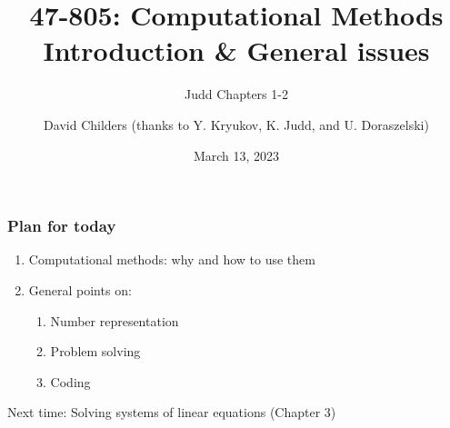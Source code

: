 \documentclass[bigger]{beamer}
\begin{document}
\title[47-805: Intro]{47-805: Computational Methods\\
Introduction \& General issues}
\subtitle{Judd Chapters 1-2}
\author[David Childers]{David Childers (thanks to Y. Kryukov, K. Judd, and U. Doraszelski)}
\date[Mar-13]{March 13, 2023}
\maketitle

\begin{frame}%

\frametitle{Plan for today}

\begin{enumerate}
\item Computational methods: why and how to use them

\item General points on:

\begin{enumerate}
\item Number representation

\item Problem solving

\item Coding\bigskip
\end{enumerate}
\end{enumerate}

Next time: Solving systems of linear equations (Chapter 3)


\end{frame}%
\end{document}
